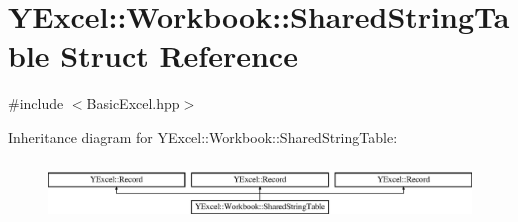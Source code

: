 \hypertarget{struct_y_excel_1_1_workbook_1_1_shared_string_table}{}\section{Y\+Excel\+:\+:Workbook\+:\+:Shared\+String\+Table Struct Reference}
\label{struct_y_excel_1_1_workbook_1_1_shared_string_table}


{\ttfamily \#include $<$Basic\+Excel.\+hpp$>$}

Inheritance diagram for Y\+Excel\+:\+:Workbook\+:\+:Shared\+String\+Table\+:\begin{figure}[H]
\begin{center}
\leavevmode
\includegraphics[height=1.602289cm]{struct_y_excel_1_1_workbook_1_1_shared_string_table}
\end{center}
\end{figure}
